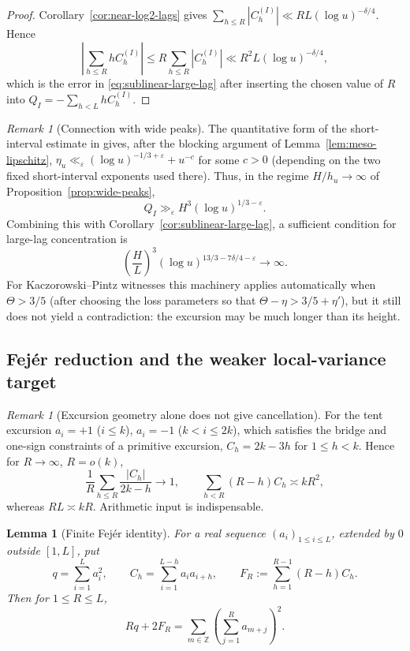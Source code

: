 \documentclass[11pt]{amsart}
\numberwithin{equation}{section}
\theoremstyle{plain}
\newtheorem{lemma}[theorem]{Lemma}
\theoremstyle{definition}
\theoremstyle{remark}
\newtheorem{remark}[theorem]{Remark}
\begin{document}
\begin{proof}
Corollary~\ref{cor:near-log2-lags} gives
$\sum_{h\le R}|C_h^{(I)}|\ll RL(\log u)^{-\delta/4}$. Hence
\[
\left|\sum_{h\le R}hC_h^{(I)}\right|
\le R\sum_{h\le R}|C_h^{(I)}|
\ll R^2L(\log u)^{-\delta/4},
\]
which is the error in \eqref{eq:sublinear-large-lag} after inserting the
chosen value of $R$ into $Q_I=-\sum_{h<L}hC_h^{(I)}$.
\end{proof}

\begin{remark}[Connection with wide peaks]
\label{rem:sublinear-wide-peaks}
The quantitative form of the short-interval estimate in
\cite[Theorem~1.1]{MatomakiTeravainen2023} gives, after the blocking argument
of Lemma~\ref{lem:meso-lipschitz},
$\eta_u\ll_\varepsilon(\log u)^{-1/3+\varepsilon}+u^{-c}$ for some $c>0$
(depending on the two fixed short-interval exponents used there). Thus, in
the regime $H/h_u\to\infty$ of Proposition~\ref{prop:wide-peaks},
\[
Q_I\gg_\varepsilon H^3(\log u)^{1/3-\varepsilon}.
\]
Combining this with Corollary~\ref{cor:sublinear-large-lag}, a sufficient
condition for large-lag concentration is
\[
\left(\frac HL\right)^3
(\log u)^{13/3-7\delta/4-\varepsilon}\longrightarrow\infty.
\]
For Kaczorowski--Pintz witnesses this machinery applies automatically when
$\Theta>3/5$ (after choosing the loss parameters so that
$\Theta-\eta>3/5+\eta'$), but it still does not yield a contradiction: the
excursion may be much longer than its height.
\end{remark}

\subsection{Fej\'er reduction and the weaker local-variance target}

\begin{remark}[Excursion geometry alone does not give cancellation]
\label{rem:tent-chowla}
For the tent excursion $a_i=+1$ ($i\le k$), $a_i=-1$ ($k<i\le2k$), which
satisfies the bridge and one-sign constraints of a primitive excursion,
$C_h=2k-3h$ for $1\le h<k$. Hence for $R\to\infty$, $R=o(k)$,
\[
\frac1R\sum_{h\le R}\frac{|C_h|}{2k-h}\longrightarrow1,
\qquad
\sum_{h<R}(R-h)C_h\asymp kR^2,
\]
whereas $RL\asymp kR$. Arithmetic input is indispensable.
\end{remark}

\begin{lemma}[Finite Fej\'er identity]
\label{lem:fejer}
For a real sequence $(a_i)_{1\le i\le L}$, extended by $0$ outside
$[1,L]$, put
\[
q=\sum_{i=1}^La_i^2,
\qquad
C_h=\sum_{i=1}^{L-h}a_ia_{i+h},
\qquad
F_R:=\sum_{h=1}^{R-1}(R-h)C_h.
\]
Then for $1\le R\le L$,
\begin{equation}
\label{eq:fejer}
Rq+2F_R
=\sum_{m\in\mathbb Z}\left(\sum_{j=1}^{R}a_{m+j}\right)^2.
\end{equation}
\end{lemma}
\end{document}
